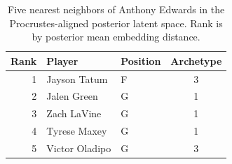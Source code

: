 \begin{table}[htbp]
  \centering\small
  \begin{tabular}{rllc}
    \toprule
    Rank & Player & Position & Archetype \\
    \midrule
    1 & Jayson Tatum & F & 3 \\
    2 & Jalen Green & G & 1 \\
    3 & Zach LaVine & G & 1 \\
    4 & Tyrese Maxey & G & 1 \\
    5 & Victor Oladipo & G & 3 \\
    \bottomrule
  \end{tabular}
  \caption{Five nearest neighbors of Anthony Edwards in the Procrustes-aligned posterior latent space. Rank is by posterior mean embedding distance.}
  \label{tab:Anthony_Edwards_neighbors}
\end{table}

